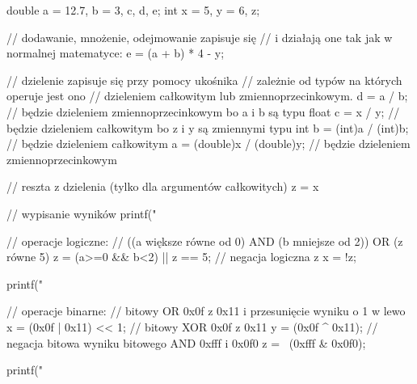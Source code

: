 \begin{CodeFrame*}[c]{}
double a = 12.7, b = 3, c, d, e;
int x = 5, y = 6, z;

// dodawanie, mnożenie, odejmowanie zapisuje się
// i działają one tak jak w normalnej matematyce:
e = (a + b) * 4 - y;

// dzielenie zapisuje się przy pomocy ukośnika
// zależnie od typów na których operuje jest ono
// dzieleniem całkowitym lub zmiennoprzecinkowym.
d = a / b; // będzie dzieleniem zmiennoprzecinkowym bo a i b są typu float
c = x / y; // będzie dzieleniem całkowitym bo z i y są zmiennymi typu int
b = (int)a / (int)b; // będzie dzieleniem całkowitym
a = (double)x / (double)y; // będzie dzieleniem zmiennoprzecinkowym

// reszta z dzielenia (tylko dla argumentów całkowitych)
z = x %

// wypisanie wyników
printf("%

// operacje logiczne:
// ((a większe równe od 0) AND (b mniejsze od 2)) OR (z równe 5)
z = (a>=0 && b<2) || z == 5;
// negacja logiczna z
x = !z;

printf("%

// operacje binarne:
// bitowy OR 0x0f z 0x11 i przesunięcie wyniku o 1 w lewo
x = (0x0f | 0x11) << 1;
// bitowy XOR 0x0f z 0x11
y = (0x0f ^ 0x11);
// negacja bitowa wyniku bitowego AND 0xfff i 0x0f0
z = ~(0xfff & 0x0f0);

printf("%
\end{CodeFrame*}

